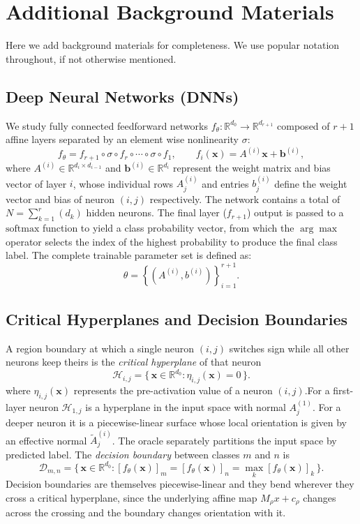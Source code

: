 \documentclass[runningheads,orivec]{llncs}
\begin{document}
\section{Additional Background Materials}
\label{app:prelim}
Here we add background materials for completeness. We use popular notation throughout, if not otherwise mentioned.

\subsection{Deep Neural Networks (DNNs)}
\label{app:prelim:notation}
We study fully connected feedforward networks $f_\theta : \mathbb{R}^{d_0} \to \mathbb{R}^{d_{r+1}}$ composed of $r+1$ affine layers separated by an element wise nonlinearity $\sigma$:
\begin{equation}
    f_\theta = f_{r+1} \circ \sigma \circ f_r \circ \cdots \circ \sigma \circ f_1, \qquad f_i(\boldsymbol{x}) = A^{(i)} \boldsymbol{x} + \boldsymbol{b}^{(i)},
\end{equation}
where $A^{(i)} \in \mathbb{R}^{d_i \times d_{i-1}}$ and $\boldsymbol{b}^{(i)} \in \mathbb{R}^{d_i}$ represent the weight matrix and bias vector of layer $i$, whose individual rows $A^{(i)}_j$ and entries $b^{(i)}_j$ define the weight vector and bias of neuron $(i,j)$ respectively. The network contains a total of $N = \sum_{k=1}^{r} (d_k)$ hidden neurons. The final layer ($f_{r+1}$)  output is passed to a $\text{softmax}$ function to yield a class probability vector, from which the $\arg\max$ operator selects the index of the highest probability to produce the final class label. The complete trainable parameter set is defined as:
\begin{equation}
    \theta = \left\{ \left( A^{(i)}, b^{(i)} \right) \right\}_{i=1}^{r+1}.
\end{equation}

\subsection{Critical Hyperplanes and Decision Boundaries}
A region boundary at which a single neuron $(i,j)$ switches sign while all other neurons keep theirs is the \emph{critical hyperplane} of that neuron
\[
  \mathcal{H}_{i,j} = \bigl\{\, \boldsymbol{x} \in \mathbb{R}^{d_0} : \eta_{i,j}(\boldsymbol{x}) = 0 \,\bigr\}.
\]
where $\eta_{i,j}(\boldsymbol{x})$ represents the pre-activation value of a neuron $(i,j)$.For a first-layer neuron $\mathcal{H}_{1,j}$ is a hyperplane in the input space with normal $A^{(1)}_j$. For a deeper neuron it is a piecewise-linear surface whose local orientation is given by an effective normal $\widetilde{A}^{(i)}_j$. The oracle separately partitions the input space by predicted label. The \emph{decision boundary} between classes $m$ and $n$ is
\[
  \mathcal{D}_{m,n} = \bigl\{\, \boldsymbol{x}\in \mathbb{R}^{d_0}: [f_\theta(\boldsymbol{x})]_m = [f_\theta(\boldsymbol{x})]_n = \max_k [f_\theta(\boldsymbol{x})]_k \,\bigr\}.
\]
Decision boundaries are themselves piecewise-linear and they bend wherever they
cross a critical hyperplane, since the underlying affine map $M_\rho x + c_\rho$
changes across the crossing and the boundary changes orientation with it.
\end{document}
